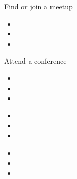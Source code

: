 \documentclass[50pt]{beamer}
\begin{document}
    \begin{frame}
        Find or join a meetup
        \begin{itemize}
            \item
            \item
            \item
        \end{itemize}
    \end{frame}

    \begin{frame}
        Attend a conference
        \begin{itemize}
            \item
            \item
            \item
        \end{itemize}
    \end{frame}

    \begin{frame}
        \begin{itemize}
            \item
            \item
            \item
        \end{itemize}
    \end{frame}

    \begin{frame}
        \begin{itemize}
            \item
            \item
            \item
        \end{itemize}
    \end{frame}
\end{document}
